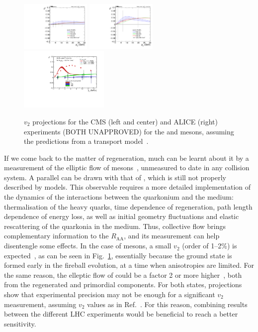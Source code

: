 \documentclass[../report.tex]{subfiles}
\providecommand{\raa}{\ensuremath{R_\text{AA}}\Xspace}
\begin{document}
\begin{figure}
\begin{center}
 \includegraphics[width=0.3\textwidth]{quarkonia/fig/cms/proj_Y1S_cent5-60.pdf}
 \includegraphics[width=0.3\textwidth]{quarkonia/fig/cms/proj_Y2S_cent5-60.pdf}
 \includegraphics[width=0.38\textwidth]{quarkonia/fig/alice/canvasFlow.pdf}
\end{center}

 \caption{$v_2$ projections for the CMS (left and center) and ALICE (right) experiments (BOTH UNAPPROVED) for the  and  mesons, assuming the predictions from a transport model~\cite{Du:2017qkv}.}
 \label{fig:upsi_v2}
\end{figure}

If we come back to the matter of regeneration, much can be learnt about it by a measurement of the elliptic flow of  mesons~\cite{Das:2018xel}, 
unmeasured to date in any collision system. 
A parallel can be
drawn with that of \PJgy, which is still not properly described by models. This observable requires a more detailed implementation of the dynamics of the interactions between the 
quarkonium and the medium: thermalisation of the heavy quarks, time dependence of regeneration, path length dependence of energy loss, as well as initial geometry fluctuations and 
elastic rescattering of the quarkonia in the medium. Thus, collective flow brings complementary information to the \raa, and its measurement can help disentengle some
effects. In the case of  mesons, a small $v_2$ (order of 1--2\%) is expected~\cite{Du:2017qkv,Yao:2018zrg}, as can be seen in Fig.~\ref{fig:upsi_v2},
essentially because the ground state is formed early in the fireball evolution, at a time when 
anisotropies are limited. For the same reason, the elleptic flow of  could be a factor 2 or more higher~\cite{Du:2017qkv}, both from the regenerated and primordial
components. For both states, projections show that experimental precision may not be enough for a significant $v_2$ measurement, assuming $v_2$ values as in Ref.~\cite{Du:2017qkv}. For this reason,
combining results between the different LHC experiments would be beneficial to reach a better sensitivity.
\end{document}

